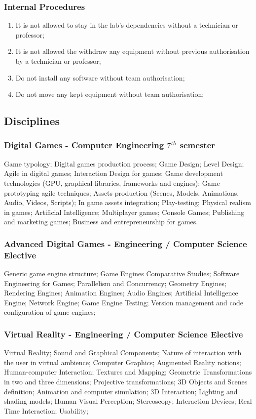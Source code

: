 \subsubsection{Internal Procedures}
\begin{enumerate}
    \item It is not allowed to stay in the lab's dependencies without a technician or professor;
    \item It is not allowed the withdraw any equipment without previous authorisation by a technician or professor; 
    \item Do not install any software without team authorisation;
    \item Do not move any kept equipment without team authorisation;
\end{enumerate}

\newpage
\subsection{Disciplines}

\subsubsection{Digital Games - Computer Engineering $7^{th}$ semester} 
Game typology; Digital games production process; Game Design; Level Design; Agile in digital games; Interaction Design for games; Game development technologies (GPU, graphical libraries, frameworks and engines); Game prototyping agile techniques; Assets production (Scenes, Models, Animations, Audio, Videos, Scripts); In game assets integration; Play-testing; Physical realism in games; Artificial Intelligence; Multiplayer games; Console Games; Publishing and marketing games; Business and entrepreneurship 
for games.

\subsubsection{Advanced Digital Games - Engineering / Computer Science Elective}
Generic game engine structure; Game Engines Comparative Studies; Software Engineering for Games; Parallelism and Concurrency; Geometry Engines; Rendering Engines; Animation Engines; Audio Engines; Artificial Intelligence Engine; Network Engine; Game Engine Testing; Version management and code configuration of game engines;

\subsubsection{Virtual Reality - Engineering / Computer Science Elective}
Virtual Reality; Sound and Graphical Components; Nature of interaction with the user in virtual ambience; Computer Graphics; Augmented Reality notions; Human-computer Interaction; Textures and Mapping; Geometric Transformations in two and three dimensions; Projective transformations; 3D Objects and Scenes definition; Animation and computer simulation; 3D Interaction; Lighting and shading models; Human Visual Perception; Stereoscopy; Interaction Devices; Real Time Interaction; Usability;

